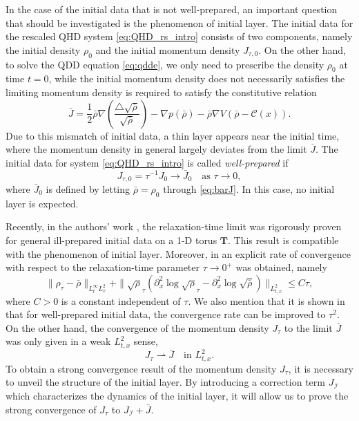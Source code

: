 \documentclass[english]{amsart}
\theoremstyle{plain}
\theoremstyle{definition}
\theoremstyle{remark}
\theoremstyle{plain}
\theoremstyle{plain}
\theoremstyle{plain}
\def\T{{\mathbf T}}%
\def\d{{\partial}}
\numberwithin{equation}{section}
\begin{document}
In the case of the initial data that is not well-prepared, an important question that should be investigated is the phenomenon of initial layer. The initial data for the rescaled QHD system \eqref{eq:QHD_rs_intro} consists of two components, namely the initial density $\rho_0$ and the initial momentum density $J_{\tau,0}$. On the other hand, to solve the QDD equation \eqref{eq:qdde}, we only need to prescribe the density $\rho_0$ at time $t=0$, while the initial momentum density does not necessarily satisfies the limiting momentum density is required to satisfy the constitutive relation
\begin{equation}\label{eq:barJ}
\bar{J}=\frac{1}{2}\bar\rho\nabla\left(\frac{\triangle\sqrt{\bar\rho}}{\sqrt{\bar\rho}}\right)-\nabla p(\bar\rho)-\bar\rho\nabla V(\bar\rho-\mathcal{C}(x)).
\end{equation} 
Due to this mismatch of initial data, a thin layer appears near the initial time, where the momentum density in general largely deviates from the limit $\bar J$. 
The initial data for system \eqref{eq:QHD_rs_intro} is called \textit{well-prepared} if 
\begin{equation}\label{eq:cond_wellpre}
J_{\tau, 0}=\tau^{-1}J_0\to\bar J_0\quad\textrm{as }\tau\to 0,
\end{equation}
 where $\bar J_0$ is defined by letting $\bar\rho=\rho_0$ through \eqref{eq:barJ}. In this case, no initial layer is expected. 

Recently, in the authors' work \cite{AMZ3}, the relaxation-time limit was rigorously proven for general ill-prepared initial data on a 1-D torus $\T$. This result is compatible with  the phenomenon of initial layer. Moreover, in \cite{AMZ3} an explicit rate of convergence with respect to the relaxation-time parameter $\tau\to 0^+$ was obtained, namely
\[
\|\rho_\tau-\bar\rho\|_{L^\infty_tL^2_x}+\|\sqrt\rho_\tau (\d_x^2\log\sqrt\rho_\tau-\d_x^2\log\sqrt{\bar\rho})\|_{L^2_{t,x}}\leq C\tau,
\]
where $C>0$ is a constant independent of $\tau$. We also mention that it is shown in \cite{LT} that for well-prepared initial data, the convergence rate can be improved to $\tau^2$. On the other hand, the convergence of the momentum density $J_\tau$ to the limit $\bar J$ was only given in a weak $L^2_{t,x}$ sense,
\[
J_\tau \rightharpoonup \bar J \quad\textrm{in }L^2_{t,x}.
\]
To obtain a strong convergence result of the momentum density $J_\tau$, it is necessary to unveil the structure of the initial layer. By introducing a correction term $J_\mathcal{I}$ which characterizes the dynamics of the initial layer, it will allow us to prove the strong convergence of $J_\tau$ to $J_\mathcal{I}+\bar J$.
\end{document}
